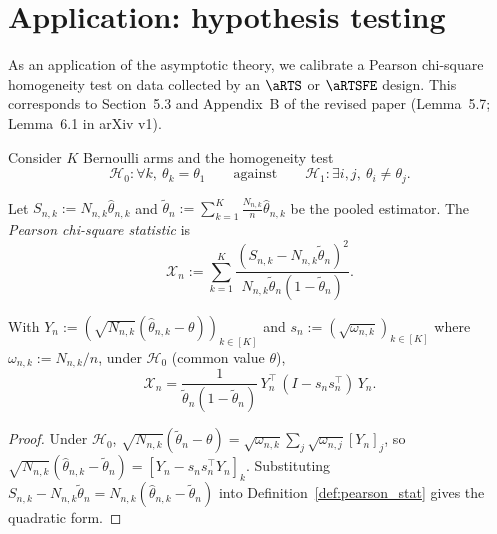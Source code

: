 \chapter{Application: hypothesis testing}
\label{chap:testing}

As an application of the asymptotic theory, we calibrate a Pearson chi-square
homogeneity test on data collected by an $\aRTS$ or $\aRTSFE$ design. This
corresponds to Section~5.3 and Appendix~B of the revised paper (Lemma~5.7; Lemma~6.1 in arXiv v1).

Consider $K$ Bernoulli arms and the homogeneity test
\[
  \mathcal{H}_0 : \forall k,\ \theta_k = \theta_1
  \qquad\text{against}\qquad
  \mathcal{H}_1 : \exists i,j,\ \theta_i \ne \theta_j.
\]

\begin{definition}\label{def:pearson_stat}
\leanok
{}
Let $S_{n,k} := N_{n,k}\hat{\theta}_{n,k}$ and
$\tilde{\theta}_n := \sum_{k=1}^K \frac{N_{n,k}}{n}\hat{\theta}_{n,k}$ be the
pooled estimator. The \emph{Pearson chi-square statistic} is
\[
  \mathcal{X}_n := \sum_{k=1}^K \frac{(S_{n,k} - N_{n,k}\tilde{\theta}_n)^2}
                                        {N_{n,k}\tilde{\theta}_n(1-\tilde{\theta}_n)}.
\]
\end{definition}

\begin{lemma}\label{lem:pearson_quadform}
\leanok
{}
With $Y_n := (\sqrt{N_{n,k}}(\hat{\theta}_{n,k}-\theta))_{k\in[K]}$ and
$s_n := (\sqrt{\omega_{n,k}})_{k\in[K]}$ where $\omega_{n,k}:=N_{n,k}/n$, under
$\mathcal{H}_0$ (common value $\theta$),
\[
  \mathcal{X}_n = \frac{1}{\tilde{\theta}_n(1-\tilde{\theta}_n)}\,
                  Y_n^\top\,(I - s_n s_n^\top)\,Y_n.
\]
\end{lemma}

\begin{proof}\leanok
Under $\mathcal{H}_0$, $\sqrt{N_{n,k}}(\tilde{\theta}_n-\theta)
 = \sqrt{\omega_{n,k}}\sum_j\sqrt{\omega_{n,j}}[Y_n]_j$, so
$\sqrt{N_{n,k}}(\hat{\theta}_{n,k}-\tilde{\theta}_n) = [Y_n - s_n s_n^\top Y_n]_k$.
Substituting $S_{n,k}-N_{n,k}\tilde{\theta}_n = N_{n,k}(\hat{\theta}_{n,k}-\tilde{\theta}_n)$
into Definition~\ref{def:pearson_stat} gives the quadratic form.
\end{proof}

